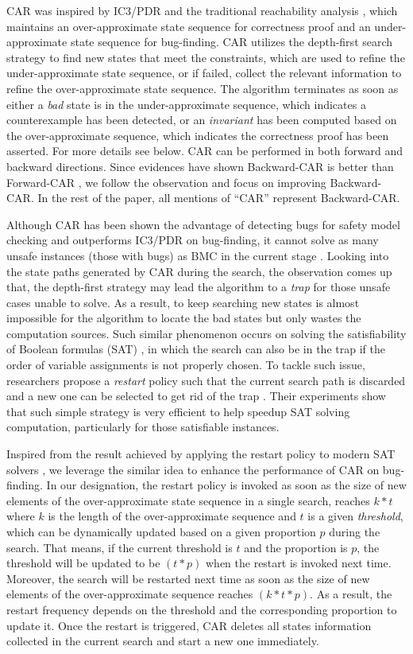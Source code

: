 CAR was inspired by IC3/PDR and the traditional reachability analysis \cite{LZZPV17}, which maintains an over-approximate state sequence for correctness proof and an under-approximate state sequence for bug-finding. CAR utilizes the depth-first search strategy to find new states that meet the constraints, which are used to refine the under-approximate state sequence, or if failed, collect the relevant  information to refine the over-approximate state sequence. The algorithm terminates as soon as either a \emph{bad} state is in the under-approximate sequence, which indicates a counterexample has been detected, or an \emph{invariant} has been computed based on the over-approximate sequence, which indicates the correctness proof has been asserted.  For more details see below. CAR can be performed in both forward and backward directions. Since evidences have shown Backward-CAR is better than Forward-CAR \cite{LDPRV18}, we follow the observation and focus on improving Backward-CAR. In the rest of the paper, all mentions of ``CAR'' represent Backward-CAR. 

Although CAR has been shown the advantage of detecting bugs for safety model checking and outperforms IC3/PDR on bug-finding, it cannot solve as many unsafe instances (those with bugs) as BMC in the current stage \cite{DLPVR19}. Looking into the state paths generated by CAR during the search, the observation comes up that, the depth-first strategy may lead the algorithm to a \emph{trap} for those unsafe cases unable to solve. As a result, to keep searching new states is almost impossible for the algorithm to locate the bad states but only wastes the computation sources. Such similar phenomenon occurs on solving the satisfiability of Boolean formulas (SAT) \cite{VWM15}, in which the search can also be in the trap if the order of variable assignments is not properly chosen. To tackle such issue, researchers propose a \emph{restart} policy such that the current search path is discarded and a new one can be selected to get rid of the trap \cite{Biere08}. Their experiments show that such simple strategy is very efficient to help speedup  SAT solving computation, particularly for those satisfiable instances. 

Inspired from the result achieved by applying the restart policy to modern SAT solvers \cite{Biere08}, we leverage the similar idea to enhance the performance of CAR on bug-finding. In our designation, the restart policy is invoked as soon as the size of new elements of the over-approximate state sequence in a single search, reaches $k*t$ where $k$ is the length of the over-approximate sequence and $t$ is a given  \emph{threshold}, which can be dynamically updated based on a given proportion $p$ during the search. That means, if the current threshold is $t$ and the proportion is $p$, the threshold will be updated to be $(t*p)$ when the restart is invoked next time. Moreover, the search will be restarted next time as soon as the size of new elements of the over-approximate sequence reaches $(k*t*p)$. As a result, the restart frequency depends on the threshold and the corresponding proportion to update it. Once the restart is triggered, CAR deletes all states information collected in the current search and start a new one immediately. 


